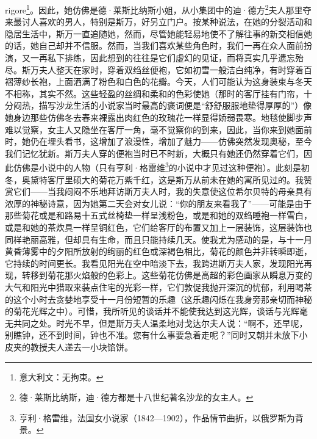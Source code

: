 rigore\footnote{意大利文：无拘束。}。因此，她仿佛是德·莱斯比纳斯小姐，从小集团中的迪·德方\footnote{德·莱斯比纳斯，迪·德方都是十八世纪著名沙龙的女主人。}夫人那里夺来最讨人喜欢的男人，特别是斯万，好另立门户。按某种说法，在她的分裂活动和隐居生活中，斯万一直追随她，然而，尽管她能轻易地使不了解往事的新交相信她的话，她自己却并不信服。然而，当我们喜欢某些角色时，我们一再在众人面前扮演，又一再私下排练，因此想到的往往是它们虚幻的见证，而将真实几乎遗忘殆尽。斯万夫人整天在家时，穿着双绉丝便袍，它如初雪一般洁白纯净，有时穿着百褶薄纱长袍，上面洒满了粉色和白色的花瓣。今天，人们可能认为这身装束与冬天不相称，其实不然。这些轻盈的丝绸和柔和的色彩使她（那时的客厅挂有门帘，十分闷热，描写沙龙生活的小说家当时最高的褒词便是“舒舒服服地垫得厚厚的”）像她身边那些仿佛冬去春来裸露出肉红色的玫瑰花一样显得娇弱畏寒。地毯使脚步声难以觉察，女主人又隐坐在客厅一角，毫不觉察你的到来，因此，当你来到她面前时，她仍在埋头看书，这增加了浪漫性，增加了魅力——仿佛突然发现奥秘，至今我们记忆犹新。斯万夫人穿的便袍当时已不时新，大概只有她还仍然穿着它们，因此仿佛是小说中的人物（只有亨利·格雷维\footnote{亨利·格雷维，法国女小说家（1842—1902），作品情节曲折，以俄罗斯为背景。}的小说中才见过这种便袍）。此刻是初冬，奥黛特客厅里硕大的菊花万紫千红，这是斯万从前未在她的寓所见过的。我赞赏它们——当我闷闷不乐地拜访斯万夫人时，我的失意使这位希尔贝特的母亲具有浓厚的神秘诗意，因为她第二天会对女儿说：“你的朋友来看我了”——可能是由于那些菊花或是和路易十五式丝椅垫一样呈浅粉色，或是和她的双绉睡袍一样雪白，或是和她的茶炊具一样呈铜红色，它们给客厅的布置又加上一层装饰，这层装饰也同样艳丽高雅，但却具有生命，而且只能持续几天。使我尤为感动的是，与十一月黄昏薄雾中的夕阳所放射的绚丽的红色或深褐色相比，菊花的颜色并非转瞬即逝，它持续的时间更长。我看见阳光在空中暗淡下去，我跨进斯万夫人家，发现阳光再现，转移到菊花那火焰般的色彩上。这些菊花仿佛是高超的彩色画家从瞬息万变的大气和阳光中猎取来装点住宅的光彩一样，它们敦促我抛开深沉的忧郁，利用喝茶的这个小时去贪婪地享受十一月份短暂的乐趣（这乐趣闪烁在我身旁那亲切而神秘的菊花光辉之中）。可惜，我所听见的谈话并不能使我达到这光辉，谈话与光辉毫无共同之处。时光不早，但是斯万夫人温柔地对戈达尔夫人说：“啊不，还早呢，别瞧钟，还不到时间，钟也不准。您有什么事要急着走呢？”同时又朝并未放下小皮夹的教授夫人递去一小块馅饼。
